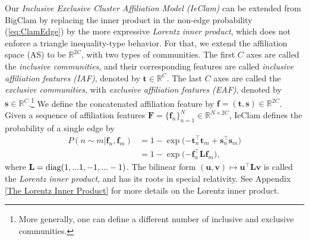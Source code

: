 \documentclass[letterpaper]{article} %
\begin{document}
Our \emph{Inclusive Exclusive Cluster Affiliation Model (IeClam)} can be extended from BigClam by replacing the inner product in the non-edge probability (\ref{eq:ClamEdge}) by the more expressive \emph{Lorentz inner product}, which does not enforce a triangle inequality-type behavior. 
For that, we extend the affiliation space (AS) to be $\mathbb{R}^{2C}$, with two types of communities. The first $C$ axes are called the \emph{inclusive communities}, and their corresponding features are called \emph{inclusive affiliation features (IAF)}, denoted by $\mathbf{t}\in\mathbb{R}^C$. The last $C$ axes are called the \emph{exclusive communities}, with \emph{exclusive affiliation features (EAF)}, denoted by $\mathbf{s} \in \mathbb{R}^C$.\footnote{More generally, one can define a different number of inclusive and exclusive communities.} We define the concatenated affiliation feature by $\mathbf{f} = (\mathbf{t},\mathbf{s})\in\mathbb{R}^{2C}$. Given a sequence of affiliation features  $\mathbf{F}=\{\mathbf{f}_n\}_{n=1}^N\in\mathbb{R}^{N\times 2C}$, IeClam defines the probability of a single edge by
\begin{equation}
\begin{split}
    P(n\sim m| \mathbf{f}_n,\mathbf{f}_m) & = 1-\exp\big({-\mathbf{t}_n^{\top } \mathbf{t}_m +  \mathbf{s}_n^{\top } \mathbf{s}_m}\big) \\  
   &  = 1-\exp\big({-\mathbf{f}_n^{\top } \mathbf{L} \mathbf{f}_m}\big),
    \label{eq:LorFeature}
    \end{split}
\end{equation}
where $\mathbf{L} = {\rm diag}(1,...1,-1,...-1)$. The bilinear form $(\mathbf{u},\mathbf{v})\mapsto \mathbf{u}^\top  \mathbf{L} \mathbf{v}$ is called the \emph{Lorentz inner product}, and has its roots in special relativity. See Appendix \ref{The Lorentz Inner Product} for more details on the Lorentz inner product. 
\end{document}

